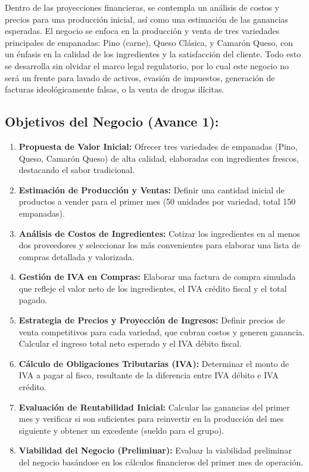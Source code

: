 \documentclass[12pt]{article}
\begin{document}
Dentro de las proyecciones financieras, se contempla un análisis de costos y precios para una producción inicial, así como una estimación de las ganancias esperadas. El negocio se enfoca en la producción y venta de tres variedades principales de empanadas: Pino (carne), Queso Clásica, y Camarón Queso, con un énfasis en la calidad de los ingredientes y la satisfacción del cliente. Todo esto se desarrolla sin olvidar el marco legal regulatorio, por lo cual este negocio no será un frente para lavado de activos, evasión de impuestos, generación de facturas ideológicamente falsas, o la venta de drogas ilícitas. \\ %


\subsection{Objetivos del Negocio (Avance 1):}
\begin{enumerate}
    \item \textbf{Propuesta de Valor Inicial:} Ofrecer tres variedades de empanadas (Pino, Queso, Camarón Queso) de alta calidad, elaboradas con ingredientes frescos, destacando el sabor tradicional.
    \item \textbf{Estimación de Producción y Ventas:} Definir una cantidad inicial de productos a vender para el primer mes (50 unidades por variedad, total 150 empanadas).
    \item \textbf{Análisis de Costos de Ingredientes:} Cotizar los ingredientes en al menos dos proveedores y seleccionar los más convenientes para elaborar una lista de compras detallada y valorizada.
    \item \textbf{Gestión de IVA en Compras:} Elaborar una factura de compra simulada que refleje el valor neto de los ingredientes, el IVA crédito fiscal y el total pagado.
    \item \textbf{Estrategia de Precios y Proyección de Ingresos:} Definir precios de venta competitivos para cada variedad, que cubran costos y generen ganancia. Calcular el ingreso total neto esperado y el IVA débito fiscal.
    \item \textbf{Cálculo de Obligaciones Tributarias (IVA):} Determinar el monto de IVA a pagar al fisco, resultante de la diferencia entre IVA débito e IVA crédito.
    \item \textbf{Evaluación de Rentabilidad Inicial:} Calcular las ganancias del primer mes y verificar si son suficientes para reinvertir en la producción del mes siguiente y obtener un excedente (sueldo para el grupo).
    \item \textbf{Viabilidad del Negocio (Preliminar):} Evaluar la viabilidad preliminar del negocio basándose en los cálculos financieros del primer mes de operación.
\end{enumerate}
\end{document}
